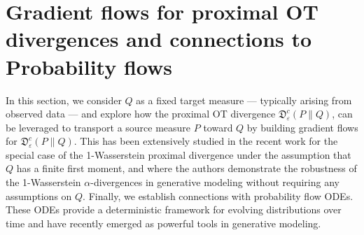 \documentclass{amsart}
\newcommand{\MK}[1]{\textcolor{orange}{MK: #1}}
\theoremstyle{definition}
\theoremstyle{remark}
\numberwithin{equation}{section}
\begin{document}



\section{Gradient flows for proximal OT divergences and connections to Probability flows}\label{subsect: GF}


In this section, we consider  $Q$ as a fixed target measure --- typically arising from observed data --- and explore how the proximal OT divergence
$\mathfrak{D}^{c}_{\varepsilon}(P\|Q)$, can be leveraged to transport a source measure $P$ toward $Q$ by building gradient flows for $\mathfrak{D}^{c}_{\varepsilon}(P\|Q)$. This has been extensively studied in the recent work \cite{Gu_GPA} for the special case of the 1-Wasserstein proximal divergence under the assumption that $Q$ has a finite first moment, and   \cite{chen2024learning} where the authors demonstrate the robustness of the 1-Wasserstein $\alpha$-divergences in generative modeling without requiring any assumptions on $Q$. Finally, we  establish connections with probability flow ODEs. These ODEs provide a deterministic framework for evolving distributions over time and have recently emerged as powerful tools in generative modeling. 
\end{document}
